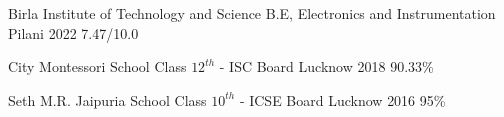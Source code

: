
\begin{cventries}
  \smallcventry
  {Birla Institute of Technology and Science}
  {B.E, Electronics and Instrumentation}
  {Pilani}
  {2022}
  {7.47/10.0}
  {}
\end{cventries}
\vspace{-4pt}
\begin{cventries}
  \smallcventry
  {City Montessori School}
  {Class $12^{th}$ - ISC Board}
  {Lucknow}
  {2018}
  {90.33\%}
  {}
\end{cventries}
\vspace{-4pt}
\begin{cventries}
  \smallcventry
  {Seth M.R. Jaipuria School}
  {Class $10^{th}$ - ICSE Board}
  {Lucknow}
  {2016}
  {95\%}
  {}
\end{cventries}
\vspace{-2mm}
